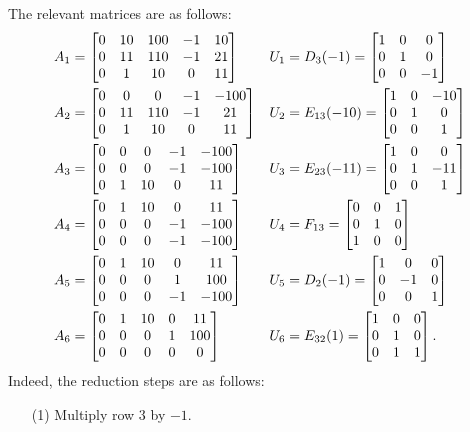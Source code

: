 \documentclass[a4paper]{amsart}
\renewenvironment{solution}{\SolutionInline}{\endSolutionInline}
\begin{document}
\begin{solution}
 The relevant matrices are as follows:
 \begin{align*}
  A_1 &= 
    \left[\begin{matrix} 0 & 10 & 100 & -1 &   10 \\
         0 & 11 & 110 & -1 &   21 \\
         0 &  1 &  10 &  0 &   11
    \end{matrix}\right] &
  U_1 &= D_3(-1) = \left[\begin{matrix} 1&0&0 \\ 0&1&0 \\ 0&0&-1 \end{matrix}\right] \\
  A_2 &= 
    \left[\begin{matrix} 0 &  0 &   0 & -1 & -100 \\
         0 & 11 & 110 & -1 &   21 \\
         0 &  1 &  10 &  0 &   11
    \end{matrix}\right] &
  U_2 &= E_{13}(-10) = \left[\begin{matrix} 1&0&-10 \\ 0&1&0 \\ 0&0&1 \end{matrix}\right] \\
  A_3 &= 
    \left[\begin{matrix} 0 &  0 &   0 & -1 & -100 \\
         0 &  0 &   0 & -1 & -100 \\
         0 &  1 &  10 &  0 &   11
    \end{matrix}\right] &
  U_3 &= E_{23}(-11) = \left[\begin{matrix} 1&0&0 \\ 0&1&-11 \\ 0&0&1 \end{matrix}\right] \\
  A_4 &= 
    \left[\begin{matrix} 0 &  1 &  10 &  0 &   11 \\
         0 &  0 &   0 & -1 & -100 \\
         0 &  0 &   0 & -1 & -100
    \end{matrix}\right] &
  U_4 &= F_{13} = \left[\begin{matrix} 0&0&1 \\ 0&1&0 \\ 1&0&0 \end{matrix}\right] \\
  A_5 &= 
    \left[\begin{matrix} 0 &  1 &  10 &  0 &   11 \\
         0 &  0 &   0 &  1 &  100 \\
         0 &  0 &   0 & -1 & -100
    \end{matrix}\right] &
  U_5 &= D_2(-1) = \left[\begin{matrix} 1&0&0 \\ 0&-1&0 \\ 0&0&1 \end{matrix}\right] \\
  A_6 &= 
    \left[\begin{matrix} 0 &  1 &  10 &  0 &   11 \\
         0 &  0 &   0 &  1 &  100 \\
         0 &  0 &   0 &  0 &    0
    \end{matrix}\right] &
  U_6 &= E_{32}(1) = \left[\begin{matrix} 1&0&0 \\ 0&1&0 \\ 0&1&1 \end{matrix}\right].
 \end{align*}
 Indeed, the reduction steps are as follows:
 \begin{itemize}
  \item[(1)] Multiply row $3$ by $-1$.

\end{itemize}
\end{solution}
\end{document}
